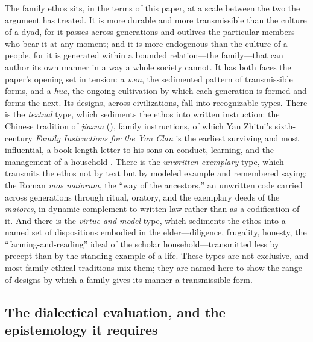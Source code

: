 The family ethos sits, in the terms of this paper, at a scale between the two the argument has treated. It is more durable and more transmissible than the culture of a dyad, for it passes across generations and outlives the particular members who bear it at any moment; and it is more endogenous than the culture of a people, for it is generated within a bounded relation---the family---that can author its own manner in a way a whole society cannot. It has both faces the paper's opening set in tension: a \emph{wen}, the sedimented pattern of transmissible forms, and a \emph{hua}, the ongoing cultivation by which each generation is formed and forms the next. Its designs, across civilizations, fall into recognizable types. There is the \emph{textual} type, which sediments the ethos into written instruction: the Chinese tradition of \emph{jiaxun} (), family instructions, of which Yan Zhitui's sixth-century \emph{Family Instructions for the Yan Clan} is the earliest surviving and most influential, a book-length letter to his sons on conduct, learning, and the management of a household \parencite{yanzhitui2021}. There is the \emph{unwritten-exemplary} type, which transmits the ethos not by text but by modeled example and remembered saying: the Roman \emph{mos maiorum}, the ``way of the ancestors,'' an unwritten code carried across generations through ritual, oratory, and the exemplary deeds of the \emph{maiores}, in dynamic complement to written law rather than as a codification of it. And there is the \emph{virtue-and-model} type, which sediments the ethos into a named set of dispositions embodied in the elder---diligence, frugality, honesty, the ``farming-and-reading'' ideal of the scholar household---transmitted less by precept than by the standing example of a life. These types are not exclusive, and most family ethical traditions mix them; they are named here to show the range of designs by which a family gives its manner a transmissible form.

\subsection*{The dialectical evaluation, and the epistemology it requires}

